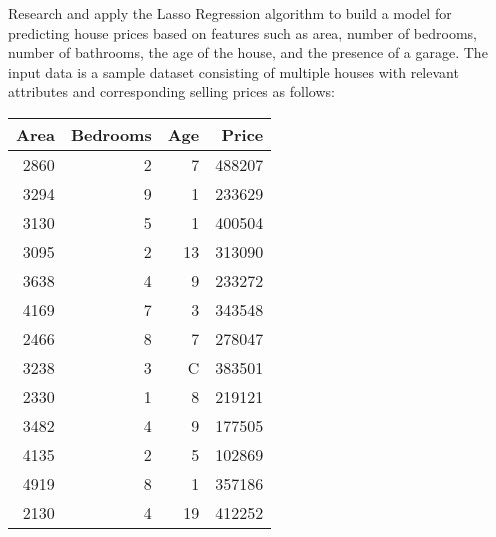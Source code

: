 \documentclass[12pt, a4paper]{report}
\begin{document}
Research and apply the Lasso Regression algorithm to build a model for predicting house prices based on features such as area, number of bedrooms, number of bathrooms, the age of the house, and the presence of a garage. The input data is a sample dataset consisting of multiple houses with relevant attributes and corresponding selling prices as follows:
\begin{table}[h!]
    \centering
    \begin{tabular}{|r|r|r|r|}
\hline
\textbf{Area} & \textbf{Bedrooms} & \textbf{Age} & \textbf{Price} \\
\hline
2860 & 2 & 7 & 488207 \\
3294 & 9 & 1 & 233629 \\
3130 & 5 & 1 & 400504 \\
3095 & 2 & 13 & 313090 \\
3638 & 4 & 9 & 233272 \\
4169 & 7 & 3 & 343548 \\
2466 & 8 & 7 & 278047 \\
3238 & 3 & C & 383501 \\
2330 & 1 & 8 & 219121 \\
3482 & 4 & 9 & 177505 \\
4135 & 2 & 5 & 102869 \\
4919 & 8 & 1 & 357186 \\
2130 & 4 & 19 & 412252 \\
\hline
\end{tabular}
\end{table}
\newpage
\end{document}
